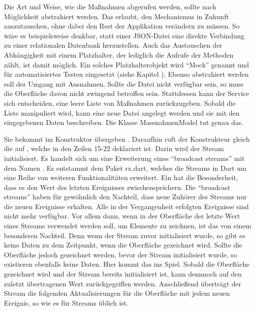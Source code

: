 Die Art und Weise, wie die Maßnahmen abgerufen werden, sollte nach Möglichkeit abstrahiert werden.
Das erlaubt, den Mechanismus in Zukunft auszutauschen, ohne dabei den Rest der Applikation verändern zu müssen.
So wäre es beispielsweise denkbar, statt einer JSON-Datei eine direkte Verbindung zu einer relationalen Datenbank herzustellen.
Auch das Austauschen der Abhängigkeit mit einem Platzhalter, der lediglich die Aufrufe der Methoden zählt, ist damit möglich.
Ein solches Platzhalterobjekt wird \enquote{Mock} genannt und für automatisiertes Testen eingesetzt (siehe Kapitel  ).
Ebenso abstrahiert werden soll der Umgang mit Ausnahmen.
Sollte die Datei nicht verfügbar sein, so muss die Oberfläche davon nicht zwingend betroffen sein.
Stattdessen kann der Service sich entscheiden, eine leere Liste von Maßnahmen zurückzugeben.
Sobald die Liste manipuliert wird, kann eine neue Datei angelegt werden und sie mit den eingegebenen Daten beschreiben.
Die Klasse MassnahmenModel \Lst{\ref{lst:Schritt1KlasseMassnahmenModel}} tut genau das.






Sie bekommt  im Konstruktor übergeben .
Daraufhin ruft der Konstrukteur gleich die  auf , welche in den Zeilen 15-22 deklariert ist.
Darin wird der Stream   initialisiert.
Es handelt sich um eine Erweiterung eines \enquote{broadcast streams} mit dem Namen  .
Es entstammt dem Paket rx.dart, welches die Streams in Dart um eine Reihe von weiteren Funktionalitäten erweitert. Ein  hat die Besonderheit, dass es den Wert des letzten Ereignisses zwischenspeichern. Die \enquote{broadcast streams} haben für gewöhnlich den Nachteil, dass neue Zuhörer des Streams nur die neuen Ereignisse erhalten. Alle in der Vergangenheit erfolgten Ereignisse sind nicht mehr verfügbar. Vor allem dann, wenn in der Oberfläche der letzte Wert eines Streams verwendet werden soll, um Elemente zu zeichnen, ist das von einem besonderen Nachteil. Denn wenn der Stream zuvor initialisiert wurde, so gibt es keine Daten zu dem Zeitpunkt, wenn die Oberfläche gezeichnet wird. Sollte die Oberfläche jedoch gezeichnet werden, bevor der Stream initialisiert wurde, so  existieren ebenfalls keine Daten. Hier kommt das  ins Spiel. Sobald die Oberfläche gezeichnet wird und der Stream bereits initialisiert ist, kann dennnoch auf den zuletzt übertragenen Wert zurückgegriffen werden. Anschließend überträgt der Stream die folgenden Aktualisierungen für die Oberfläche mit jedem neuen Ereignis, so wie es für Streams üblich ist.


